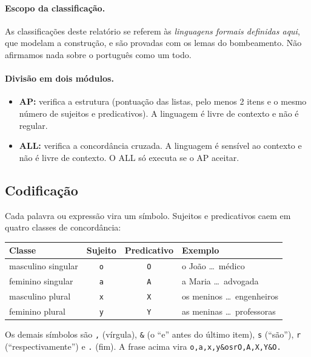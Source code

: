 \documentclass[11pt,a4paper]{article}
\newcommand{\cad}[1]{\texttt{#1}}       %
\begin{document}
\paragraph{Escopo da classificação.} As classificações deste relatório se referem às \emph{linguagens formais definidas aqui}, que modelam a construção, e são provadas com os lemas do bombeamento. Não afirmamos nada sobre o português como um todo.

\paragraph{Divisão em dois módulos.}
\begin{itemize}
  \item \textbf{AP:} verifica a estrutura (pontuação das listas, pelo menos 2 itens e o mesmo número de sujeitos e predicativos). A linguagem é livre de contexto e não é regular.
  \item \textbf{ALL:} verifica a concordância cruzada. A linguagem é sensível ao contexto e não é livre de contexto. O ALL só executa se o AP aceitar.
\end{itemize}

\subsection{Codificação}

Cada palavra ou expressão vira um símbolo. Sujeitos e predicativos caem em quatro classes de concordância:

\begin{center}
\begin{tabular}{lccl}
\toprule
Classe & Sujeito & Predicativo & Exemplo \\
\midrule
masculino singular & \cad{o} & \cad{O} & o João \ldots\ médico \\
feminino singular  & \cad{a} & \cad{A} & a Maria \ldots\ advogada \\
masculino plural   & \cad{x} & \cad{X} & os meninos \ldots\ engenheiros \\
feminino plural    & \cad{y} & \cad{Y} & as meninas \ldots\ professoras \\
\bottomrule
\end{tabular}
\end{center}

Os demais símbolos são \cad{,} (vírgula), \cad{\&} (o ``e'' antes do último item), \cad{s} (``são''), \cad{r} (``respectivamente'') e \cad{.} (fim). A frase acima vira \cad{o,a,x,y\&osrO,A,X,Y\&O.}
\end{document}
